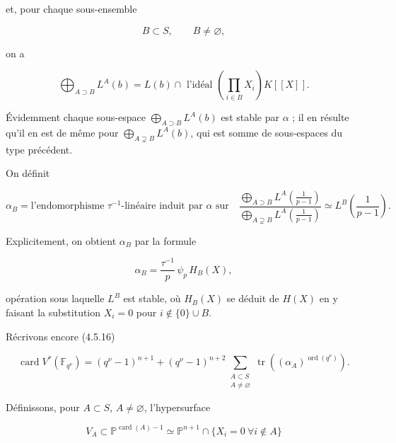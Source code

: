 
et, pour chaque sous-ensemble

\[
B\subset S,\qquad B\ne\varnothing,
\]

on a

\begin{equation}\tag{4.5.20}
\bigoplus_{A\supset B}L^A(b)
=L(b)\cap\text{ l'idéal }
\left(\prod_{i\in B}X_i\right)K[[X]].
\end{equation}

Évidemment chaque sous-espace $\bigoplus_{A\supset B}L^A(b)$ est stable
par $\alpha$ ; il en résulte qu'il en est de même pour
$\bigoplus_{A\supsetneq B}L^A(b)$, qui est somme de sous-espaces du type
précédent.

On définit

\begin{equation}\tag{4.5.21}
\alpha_B=\text{l'endomorphisme $\tau^{-1}$-linéaire induit par $\alpha$ sur}
\quad
\frac{\displaystyle\bigoplus_{A\supset B}
L^A\!\left(\frac1{p-1}\right)}
{\displaystyle\bigoplus_{A\supsetneq B}
L^A\!\left(\frac1{p-1}\right)}
\simeq L^B\!\left(\frac1{p-1}\right).
\end{equation}

Explicitement, on obtient $\alpha_B$ par la formule

\begin{equation}\tag{4.5.22}
\alpha_B=\frac{\tau^{-1}}p\,\psi_p\,H_B(X),
\end{equation}

opération sous laquelle $L^B$ est stable, où $H_B(X)$ se déduit de $H(X)$
en y faisant la substitution $X_i=0$ pour $i\notin\{0\}\cup B$.

Récrivons encore (4.5.16)

\begin{equation}\tag{4.5.23}
\operatorname{card}V^*(\mathbb F_{q^\nu})
=(q^\nu-1)^{n+1}
+(q^\nu-1)^{n+2}
\sum_{\substack{A\subset S\\A\ne\varnothing}}
\operatorname{tr}\!\left((\alpha_A)^{\operatorname{ord}(q^\nu)}\right).
\end{equation}

Définissons, pour $A\subset S$, $A\ne\varnothing$, l'hypersurface

\begin{equation}\tag{4.5.24}
V_A\subset\mathbb P^{\operatorname{card}(A)-1}
\simeq
\mathbb P^{n+1}\cap
\{X_i=0\ \forall i\notin A\}
\end{equation}

